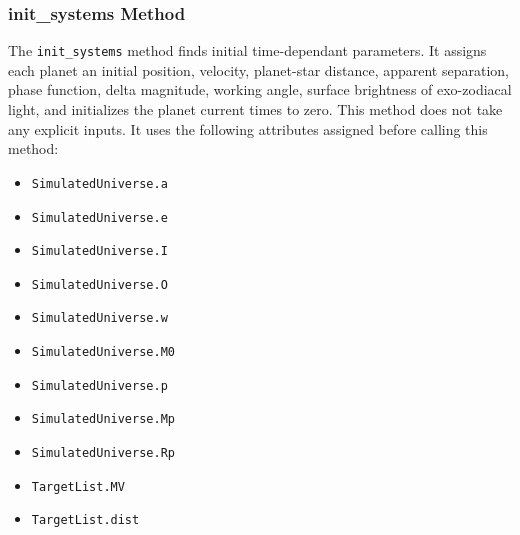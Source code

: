 \documentclass[cleanfoot]{asme2ej}
\begin{document}
\subsubsection{init\_systems Method} \label{sec:initsystemstask}
The \verb+init_systems+ method finds initial time-dependant parameters. It assigns each planet an initial position, velocity, planet-star distance, apparent separation, phase function, delta magnitude, working angle, surface brightness of exo-zodiacal light, and initializes the planet current times to zero. This method does not take any explicit inputs.  It uses the following attributes assigned before calling this method:
\begin{itemize}
    \item \verb+SimulatedUniverse.a+
    \item \verb+SimulatedUniverse.e+
    \item \verb+SimulatedUniverse.I+
    \item \verb+SimulatedUniverse.O+
    \item \verb+SimulatedUniverse.w+
    \item \verb+SimulatedUniverse.M0+
    \item \verb+SimulatedUniverse.p+
    \item \verb+SimulatedUniverse.Mp+
    \item \verb+SimulatedUniverse.Rp+
    \item \verb+TargetList.MV+
    \item \verb+TargetList.dist+
\end{itemize}
\end{document}
